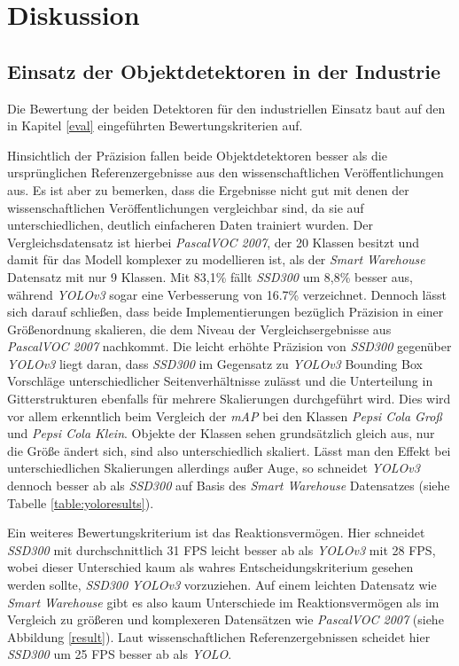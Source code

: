 \chapter{Diskussion}

\section{Einsatz der Objektdetektoren in der Industrie}

Die Bewertung der beiden Detektoren für den industriellen Einsatz baut auf den in Kapitel \ref{eval} eingeführten Bewertungskriterien auf. 

Hinsichtlich der Präzision fallen beide Objektdetektoren besser als die ursprünglichen Referenzergebnisse aus den wissenschaftlichen Veröffentlichungen aus. Es ist aber zu bemerken, dass die Ergebnisse nicht gut mit denen der wissenschaftlichen Veröffentlichungen vergleichbar sind, da sie auf unterschiedlichen, deutlich einfacheren Daten trainiert wurden. Der Vergleichsdatensatz ist hierbei \textit{PascalVOC 2007}, der 20 Klassen besitzt und damit für das Modell komplexer zu modellieren ist, als der \textit{Smart Warehouse} Datensatz mit nur 9 Klassen. Mit 83,1\% fällt \textit{SSD300} um 8,8\% besser aus, während \textit{YOLOv3} sogar eine Verbesserung von 16.7\% verzeichnet. Dennoch lässt sich darauf schließen, dass beide Implementierungen bezüglich Präzision in einer Größenordnung skalieren, die dem Niveau der Vergleichsergebnisse aus \textit{PascalVOC 2007} nachkommt. Die leicht erhöhte Präzision von \textit{SSD300} gegenüber \textit{YOLOv3} liegt daran, dass \textit{SSD300} im Gegensatz zu \textit{YOLOv3} Bounding Box Vorschläge unterschiedlicher Seitenverhältnisse zulässt und die Unterteilung in Gitterstrukturen ebenfalls für mehrere Skalierungen durchgeführt wird. Dies wird vor allem erkenntlich beim Vergleich der \textit{mAP} bei den Klassen \textit{Pepsi Cola Groß} und \textit{Pepsi Cola Klein}. Objekte der Klassen sehen grundsätzlich gleich aus, nur die Größe ändert sich, sind also unterschiedlich skaliert. Lässt man den Effekt bei unterschiedlichen Skalierungen allerdings außer Auge, so schneidet \textit{YOLOv3} dennoch besser ab als \textit{SSD300} auf Basis des \textit{Smart Warehouse} Datensatzes (siehe Tabelle \ref{table:yoloresults}).

Ein weiteres Bewertungskriterium ist das Reaktionsvermögen. Hier schneidet \textit{SSD300} mit durchschnittlich 31 FPS leicht besser ab als \textit{YOLOv3} mit 28 FPS, wobei dieser Unterschied kaum als wahres Entscheidungskriterium gesehen werden sollte, \textit{SSD300} \textit{YOLOv3} vorzuziehen. Auf einem leichten Datensatz wie \textit{Smart Warehouse} gibt es also kaum Unterschiede im Reaktionsvermögen als im Vergleich zu größeren und komplexeren Datensätzen wie \textit{PascalVOC 2007} (siehe Abbildung \ref{result}). Laut wissenschaftlichen Referenzergebnissen scheidet hier \textit{SSD300} um 25 FPS besser ab als \textit{YOLO}.

